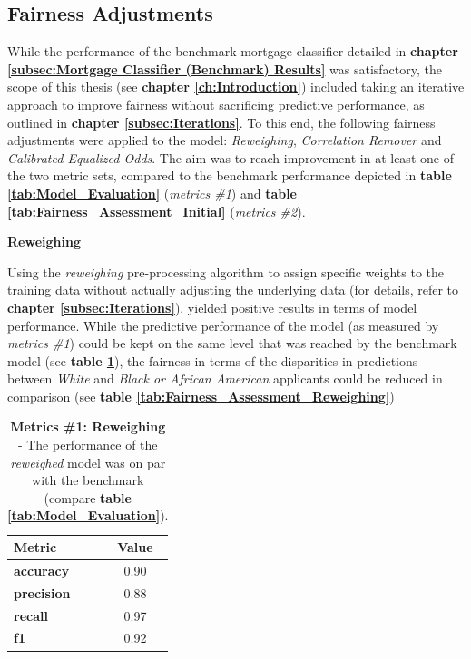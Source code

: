 \subsection{Fairness Adjustments}\label{Fairness Adjustments Results}

While the performance of the benchmark mortgage classifier detailed in \textbf{chapter \ref{subsec:Mortgage Classifier (Benchmark) Results}} was satisfactory, the scope of this thesis (see \textbf{chapter \ref{ch:Introduction}}) included taking an iterative approach to improve fairness without sacrificing predictive performance, as outlined in \textbf{chapter \ref{subsec:Iterations}}.
To this end, the following fairness adjustments were applied to the model: \textit{Reweighing}, \textit{Correlation Remover} and \textit{Calibrated Equalized Odds}. The aim was to reach improvement in at least one of the two metric sets, compared to the benchmark performance depicted in \textbf{table \ref{tab:Model_Evaluation}} (\textit{metrics \#1}) and \textbf{table \ref{tab:Fairness_Assessment_Initial}} (\textit{metrics \#2}).

\textbf{Reweighing}

Using the \textit{reweighing} pre-processing algorithm to assign specific weights to the training data without actually adjusting the underlying data (for details, refer to \textbf{chapter \ref{subsec:Iterations}}), yielded positive results in terms of model performance.
While the predictive performance of the model (as measured by \textit{metrics \#1}) could be kept on the same level that was reached by the benchmark model (see \textbf{table \ref{tab:Model_Evaluation_Reweighing}}), the fairness in terms of the disparities in predictions between \textit{White} and \textit{Black or African American} applicants could be reduced in comparison (see \textbf{table \ref{tab:Fairness_Assessment_Reweighing}})

\begin{table}[!htbp]
    \centering
    \begin{tabular}{l c}
    \toprule
    \textbf{Metric} & \textbf{Value} \\
    \midrule
    \textbf{accuracy} & 0.90 \\
    \textbf{precision} & 0.88 \\
    \textbf{recall} & 0.97 \\
    \textbf{f1} & 0.92 \\
    \bottomrule
    \end{tabular}
    \medskip
    \caption[Metrics \#1: Reweighing]{\textbf{Metrics \#1: Reweighing} - The performance of the \textit{reweighed} model was on par with the benchmark (compare \textbf{table \ref{tab:Model_Evaluation}}).}
    \label{tab:Model_Evaluation_Reweighing}
\end{table}

